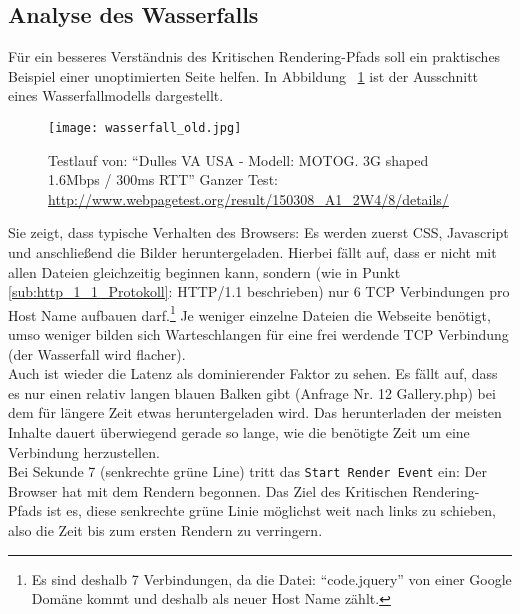 
	\pagebreak

	\subsection{Analyse des Wasserfalls}
	\label{sub:analyse_des_wasserfalls}
		Für ein besseres Verständnis des Kritischen Rendering-Pfads soll ein praktisches Beispiel einer unoptimierten Seite helfen. In Abbildung ~\ref{fig:wasserfall_old} ist der Ausschnitt eines Wasserfallmodells dargestellt. 

		\begin{figure}[htbp]
			\begin{center}
				\texttt{[image: wasserfall\_old.jpg]}
				\caption{Testlauf von: "`Dulles VA USA - Modell: MOTOG. 3G shaped 1.6Mbps / 300ms RTT"' Ganzer Test: \url{http://www.webpagetest.org/result/150308_A1_2W4/8/details/}}
				\label{fig:wasserfall_old}
			\end{center}
		\end{figure}
		
	  Sie zeigt, dass typische Verhalten des Browsers: Es werden zuerst CSS, Javascript und anschließend die Bilder heruntergeladen. Hierbei fällt auf, dass er nicht mit allen Dateien gleichzeitig beginnen kann, sondern (wie in Punkt \ref{sub:http_1_1_Protokoll}: HTTP/1.1 beschrieben) nur 6 TCP Verbindungen pro Host Name aufbauen darf.\footnote{Es sind deshalb 7 Verbindungen, da die Datei: "`code.jquery"' von einer Google Domäne kommt und deshalb als neuer Host Name zählt.} Je weniger einzelne Dateien die Webseite benötigt, umso weniger bilden sich Warteschlangen für eine frei werdende TCP Verbindung (der Wasserfall wird flacher).\\
	  Auch ist wieder die Latenz als dominierender Faktor zu sehen. Es fällt auf, dass es nur einen relativ langen blauen Balken gibt (Anfrage Nr. 12 Gallery.php) bei dem für längere Zeit etwas heruntergeladen wird. Das herunterladen der meisten Inhalte dauert überwiegend gerade so lange, wie die benötigte Zeit um eine Verbindung herzustellen.\\
	  Bei Sekunde 7 (senkrechte grüne Line) tritt das \texttt{Start Render Event} ein: Der Browser hat mit dem Rendern begonnen. Das Ziel des Kritischen Rendering-Pfads ist es, diese senkrechte grüne Linie möglichst weit nach links zu schieben, also die Zeit bis zum ersten Rendern zu verringern.\\

